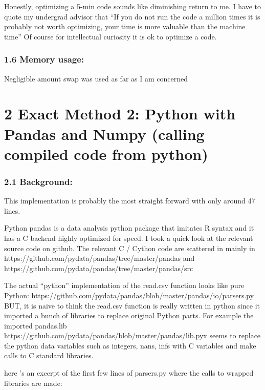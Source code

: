 \documentclass[letterpaper,10pt,english]{/usr/local/lib/python2.7/dist-packages/sphinx/texinputs/sphinxhowto}
\begin{document}
Honestly, optimizing a 5-min code sounds like diminishing return to me.
I have to quote my undergrad advisor that ``If you do not run the code a
million times it is probably not worth optimizing, your time is more
valuable than the machine time'' Of course for intellectual curiosity it
is ok to optimize a code.\section{1.6 Memory usage:}Negligible amount swap was used as far as I am concerned
\part{2 Exact Method 2: Python with Pandas and Numpy (calling compiled code
from python)}
\section{2.1 Background:}This implementation is probably the most straight forward with only around 47 lines.

Python pandas is a data analysis python package that imitates R syntax
and it has a C backend highly optimized for speed. I took a quick look
at the relevant source code on github. The relevant C / Cython code are
scattered in mainly in
https://github.com/pydata/pandas/tree/master/pandas and
https://github.com/pydata/pandas/tree/master/pandas/src

The actual ``python'' implementation of the read.csv function looks like
pure Python:
https://github.com/pydata/pandas/blob/master/pandas/io/parsers.py BUT,
it is naive to think the read.csv function is really written in python
since it imported a bunch of libraries to replace original Python parts.
For example the imported pandas.lib
https://github.com/pydata/pandas/blob/master/pandas/lib.pyx seems to
replace the python data variables such as integers, nans, infs with C
variables and make calls to C standard libraries.

here 's an excerpt of the first few lines of parsers.py where the calls
to wrapped libraries are made:

\end{document}
